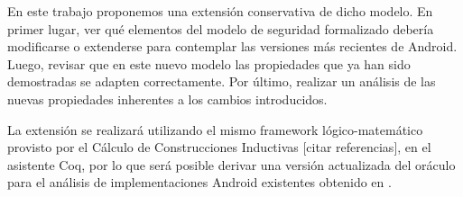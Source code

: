 En este trabajo proponemos una extensión conservativa de dicho modelo. En primer
lugar, ver qué elementos del modelo de seguridad formalizado debería modificarse
o extenderse para contemplar las versiones más recientes de Android. Luego,
revisar que en este nuevo modelo las propiedades que ya han sido demostradas se
adapten correctamente. Por último, realizar un análisis de las nuevas
propiedades inherentes a los cambios introducidos.

La extensión se realizará utilizando el mismo framework lógico-matemático
provisto por el Cálculo de Construcciones Inductivas [citar referencias], en el
asistente Coq, por lo que será posible derivar una versión actualizada del
oráculo para el análisis de implementaciones Android existentes obtenido en
\cite{fgorostiaga}.